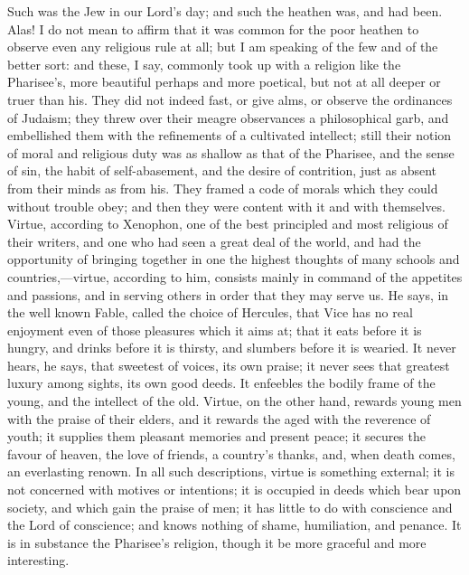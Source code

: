 Such was the Jew in our Lord's day; and such the
heathen was, and had been. Alas! I do not mean to affirm
that it was common for the poor heathen to observe even
any religious rule at all; but I am speaking of the few
and of the better sort: and these, I say, commonly took
up with a religion like the Pharisee's, more beautiful
perhaps and more poetical, but not at all deeper or truer
than his. They did not indeed fast, or give alms, or
observe the ordinances of Judaism; they threw over their
meagre observances a philosophical garb, and embellished
them with the refinements of a cultivated intellect;
still their notion of moral and religious duty was as
shallow as that of the Pharisee, and the sense of sin,
the habit of self-abasement, and the desire of
contrition, just as absent from their minds as from his.
They framed a code of morals which they could without
trouble obey; and then they were content with it and with
themselves. Virtue, according to Xenophon, one of the
best principled and most religious of their writers, and
one who had seen a great deal of the world, and had the
opportunity of bringing together in one the highest
thoughts of many schools and countries,—virtue,
according to him, consists mainly in command of the
appetites and passions, and in serving others in order
that they may serve us. He says, in the well known Fable,
called the choice of Hercules, that Vice has no real
enjoyment even of those pleasures which it aims at; that
it eats before it is hungry, and drinks before it is
thirsty, and slumbers before it is wearied. It never
hears, he says, that sweetest of voices, its own praise;
it never sees that greatest luxury among sights, its own
good deeds. It enfeebles the bodily frame of the young,
and the intellect of the old. Virtue, on the other hand,
rewards young men with the praise of their elders, and it
rewards the aged with the reverence of youth; it supplies
them pleasant memories and present peace; it secures the
favour of heaven, the love of friends, a country's
thanks, and, when death comes, an everlasting renown. In
all such descriptions, virtue is something external; it
is not concerned with motives or intentions; it is
occupied in deeds which bear upon society, and which gain
the praise of men; it has little to do with conscience
and the Lord of conscience; and knows nothing of shame,
humiliation, and penance. It is in substance the
Pharisee's religion, though it be more graceful and more
interesting.

